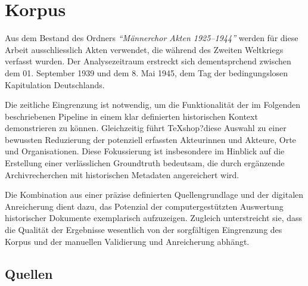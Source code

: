 \documentclass[12pt, a4paper, ngerman, bidi=default]{article}
\begin{document}
\section{Korpus}\label{section:Korpus}
Aus dem Bestand des Ordners \textit{``Männerchor Akten 1925--1944''} werden für diese Arbeit ausschliesslich Akten verwendet, 
die während des Zweiten Weltkriegs verfasst wurden. Der Analysezeitraum erstreckt sich dementsprchend zwischen dem 01. September 1939 
und dem 8. Mai 1945, dem Tag der bedingungslosen Kapitulation Deutschlands.

Die zeitliche Eingrenzung ist notwendig, um die Funktionalität der im Folgenden beschriebenen Pipeline 
in einem klar definierten historischen Kontext demonstrieren zu können. Gleichzeitig führt TeXshop?diese Auswahl zu einer 
bewussten Reduzierung der potenziell erfassten Akteurinnen und Akteure, Orte und Organisationen. Diese Fokussierung ist 
insbesondere im Hinblick auf die Erstellung einer verlässlichen Groundtruth bedeutsam, die durch ergänzende Archivrecherchen 
mit historischen Metadaten angereichert wird.

Die Kombination aus einer präzise definierten Quellengrundlage und der digitalen Anreicherung dient dazu, das 
Potenzial der computergestützten Auswertung historischer Dokumente exemplarisch aufzuzeigen. 
Zugleich unterstreicht sie, dass die Qualität der Ergebnisse wesentlich von der sorgfältigen Eingrenzung 
des Korpus und der manuellen Validierung und Anreicherung abhängt.

\subsection{Quellen}
\end{document}
